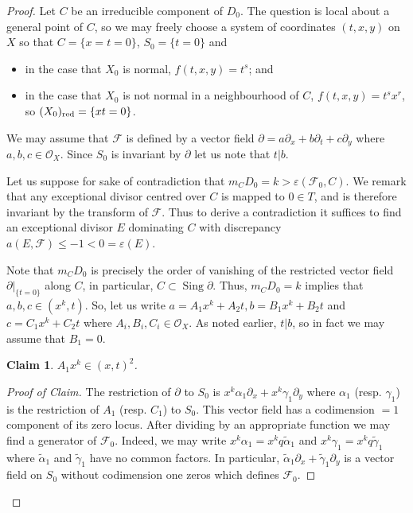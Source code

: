 \documentclass[12pt, a4paper]{amsart}
\DeclareMathOperator{\sing}{Sing}
\newtheorem{claim}[theorem]{Claim}
\theoremstyle{definition}
\theoremstyle{named}
\begin{document}
\begin{proof}
	Let $C$ be an irreducible component of $D_0$.  The question is local about a general point of  $C$, so we may freely choose a system of coordinates $(t, x, y)$ on $X$ so that
	 $C = \{x = t = 0\}$, $S_0 = \{t = 0\}$ and 
     \begin{itemize}
         \item in the case that $X_0$ is normal, $f(t, x, y) = t^s$; and 
         \item  in the case that $X_0$ is not normal in a neighbourhood of $C$, $f(t, x, y) = t^sx^r$, so $(X_0)_{{\rm red}} = \{xt = 0\}$.
     \end{itemize}
 
	We may assume that $\mathcal F$ is defined by a vector field  $\partial = a\partial_x+b\partial_t+c\partial_y$
    where $a, b, c \in \mathcal O_X$.  Since $S_0$ is invariant by $\partial$ let us note that $t|b$.



Let us suppose for sake of contradiction that $m_CD_0 = k >\varepsilon(\mathcal F_0, C)$.
We remark that any exceptional divisor centred over $C$ is mapped to $0 \in T$, and is therefore invariant by the transform of $\mathcal F$.  Thus to derive a contradiction it suffices to find an exceptional divisor $E$ dominating $C$ with discrepancy $a(E, \mathcal F) \leq -1 < 0 = \varepsilon(E)$.




Note that $m_CD_0$ is precisely the order of vanishing of the restricted vector field $\partial|_{\{t = 0\}}$ along $C$, in particular, $C \subset \sing \partial$.  Thus,
$m_CD_0 = k$
implies that $a, b, c \in (x^k, t)$.
So, let us write $a = A_1x^k+A_2t, b = B_1x^k+B_2t$
and $c = C_1x^k+C_2t$ where $A_i, B_i, C_i \in \mathcal O_X$.
As noted earlier, $t|b$, so in fact we may assume that $B_1 = 0$.


\begin{claim}
\label{claim_order2}
$A_1x^k \in (x, t)^2$.
\end{claim}
\begin{proof}[Proof of Claim]
The restriction of $\partial$ to $S_0$ is 
$x^k\alpha_1\partial_x+x^k\gamma_1\partial_y$ where $\alpha_1$ (resp. $\gamma_1$) is the restriction of $A_1$ (resp. $C_1$) to $S_0$. This vector field has a codimension $=1$ component of its zero locus.  After dividing by an appropriate function we may find a generator of $\mathcal F_0$.  Indeed, we may write $x^k\alpha_1 = x^kq\tilde{\alpha}_1$ and 
$x^k\gamma_1 = x^kq\tilde{\gamma}_1$
where $\tilde{\alpha}_1$ and $\tilde{\gamma}_1$ have no common factors.  In particular, $\tilde{\alpha}_1\partial_x+\tilde{\gamma}_1\partial_y$
is a vector field on $S_0$ without codimension one zeros which defines $\mathcal F_0$.


\end{proof}
\end{proof}
\end{document}
